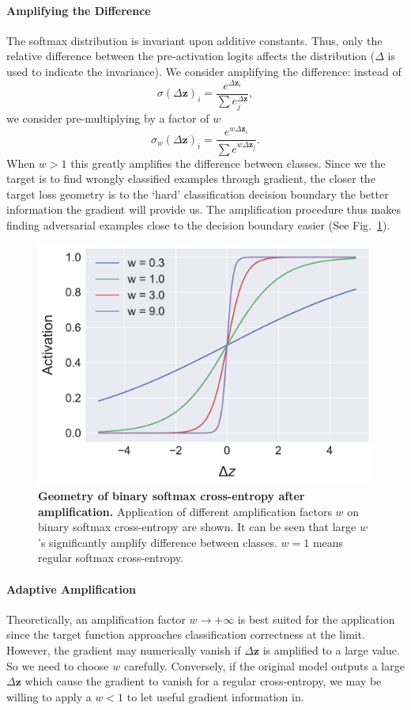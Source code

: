 \documentclass{article}
\begin{document}
        \paragraph{Amplifying the Difference} The softmax distribution is invariant upon additive constants. Thus, only the relative difference between the pre-activation logits affects the distribution ($\Delta$ is used to indicate the invariance). We consider amplifying the difference: instead of
        \newcommand{\vdz}{\Delta \mathbf{z}}
        \begin{equation}
            \sigma(\vdz)_i = \frac{e^{\vdz_i}}{\sum e^{\vdz}_j},
        \end{equation}
        we consider pre-multiplying by a factor of $w$
        \begin{equation}
            \sigma_w(\vdz)_i = \frac{e^{w\vdz_i}}{\sum e^{w\vdz_j}}.
        \end{equation}
        When $w > 1$ this greatly amplifies the difference between classes. Since we the target is to find wrongly classified examples through gradient, the closer the target loss geometry is to the `hard' classification decision boundary the better information the gradient will provide us. The amplification procedure thus makes finding adversarial examples close to the decision boundary easier (See Fig.\ \ref{fig:softmax_preamp}).
        
        \begin{figure}[ht]
            \centering
            \includegraphics[width=0.5\linewidth]{figs/bin_amp_geo.pdf}
            \caption{\textbf{Geometry of binary softmax cross-entropy after amplification.} Application of different amplification factors $w$ on binary softmax cross-entropy are shown. It can be seen that large $w$'s significantly amplify difference between classes. $w = 1$ means regular softmax cross-entropy.}
            \label{fig:softmax_preamp}
        \end{figure}
        
        \paragraph{Adaptive Amplification} Theoretically, an amplification factor $w \to +\infty$ is best suited for the application since the target function approaches classification correctness at the limit. However, the gradient may numerically vanish if $\vdz$ is amplified to a large value. So we need to choose $w$ carefully. Conversely, if the original model outputs a large $\vdz$ which cause the gradient to vanish for a regular cross-entropy, we may be willing to apply a $w < 1$ to let useful gradient information in.
        
\end{document}
